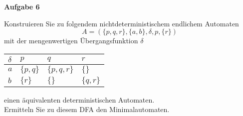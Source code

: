 \documentclass[a4paper,12pt]{article}
\newcommand{\Aufgabe}[1]{
	{
		\vspace*{0.5cm}
		\textsf{\textbf{Aufgabe #1}}
		\vspace*{0.2cm}
		
	}
}
\begin{document}
	\pagebreak
	
	\Aufgabe{6}
	Konstruieren Sie zu folgendem nichtdeterministischem endlichem Automaten
	$$A=(\{p,q,r\}, \{a,b\}, \delta, p, \{r\})$$
	mit der mengenwertigen Übergangsfunktion $\delta$
	\begin{center}
		\begin{tabular}{|l|l|l|l|}
			\hline
			$\delta$ & $p$ & $q$ & $r$ \\
			\hline
			$a$ & $\{p,q\}$ & $\{p,q,r\}$ & $\{\}$ \\
			\hline
			$b$ & $\{r\}$ & $\{\}$ & $\{q,r\}$ \\
			\hline
		\end{tabular}
	\end{center}
	einen äquivalenten deterministischen Automaten.\\
	Ermitteln Sie zu diesem DFA den Minimalautomaten. 
\end{document}
